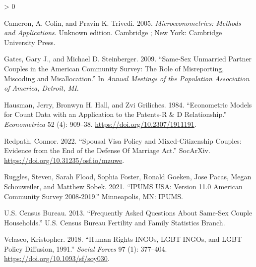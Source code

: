 \documentclass[
  12pt,
]{article}
\newlength{\cslhangindent}
\newenvironment{CSLReferences}[2] %
 {%
  \setlength{\parindent}{0pt}
  \ifodd #1 \everypar{\setlength{\hangindent}{\cslhangindent}}\ignorespaces\fi
  \ifnum #2 > 0
  \setlength{\parskip}{#2\baselineskip}
  \fi
 }%
 {}
\begin{document}
\hypertarget{refs}{}
\begin{CSLReferences}{1}{0}
\leavevmode\hypertarget{ref-cameron_2005_microeconometrics}{}%
Cameron, A. Colin, and Pravin K. Trivedi. 2005. \emph{Microeconometrics: {Methods} and {Applications}}. Unknown edition. {Cambridge ; New York}: {Cambridge University Press}.

\leavevmode\hypertarget{ref-gates_2009}{}%
Gates, Gary J., and Michael D. Steinberger. 2009. {``Same-Sex Unmarried Partner Couples in the {American Community Survey}: {The} Role of Misreporting, Miscoding and Misallocation.''} In \emph{Annual Meetings of the Population Association of America, Detroit, {MI}}.

\leavevmode\hypertarget{ref-hausman_1984_econometric}{}%
Hausman, Jerry, Bronwyn H. Hall, and Zvi Griliches. 1984. {``Econometric {Models} for {Count Data} with an {Application} to the {Patents-R} \& {D Relationship}.''} \emph{Econometrica} 52 (4): 909--38. \url{https://doi.org/10.2307/1911191}.

\leavevmode\hypertarget{ref-redpath_2022_spousal}{}%
Redpath, Connor. 2022. {``Spousal {Visa Policy} and {Mixed-Citizenship Couples}: {Evidence} from the {End} of the {Defense Of Marriage Act}.''} {SocArXiv}. \url{https://doi.org/10.31235/osf.io/mzuwe}.

\leavevmode\hypertarget{ref-ruggles_2021}{}%
Ruggles, Steven, Sarah Flood, Sophia Foster, Ronald Goeken, Jose Pacas, Megan Schouweiler, and Matthew Sobek. 2021. {``{IPUMS USA}: {Version} 11.0 {American Community Survey} 2008-2019.''} {Minneapolis, MN}: {IPUMS}.

\leavevmode\hypertarget{ref-u.s.censusbureau_2013}{}%
U.S. Census Bureau. 2013. {``Frequently {Asked Questions About Same-Sex Couple Households}.''} {U.S. Census Bureau Fertility and Family Statistics Branch}.

\leavevmode\hypertarget{ref-velasco_2018}{}%
Velasco, Kristopher. 2018. {``Human {Rights INGOs}, {LGBT INGOs}, and {LGBT Policy Diffusion}, 1991{}.''} \emph{Social Forces} 97 (1): 377--404. \url{https://doi.org/10.1093/sf/soy030}.

\end{CSLReferences}
\end{document}
